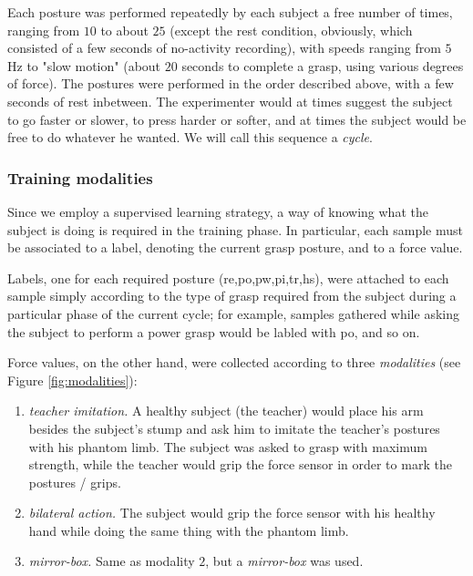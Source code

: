 \documentclass[review,authoryear]{elsarticle}
\def\re{\textsf{re}}
\def\po{\textsf{po}}
\def\pw{\textsf{pw}}
\def\pi{\textsf{pi}}
\def\tr{\textsf{tr}}
\def\hs{\textsf{hs}}
\renewcommand{\cite}{\citep}
\begin{document}
Each posture was performed repeatedly by each subject a free number of times,
ranging from $10$ to about $25$ (except the rest condition, obviously, which consisted
of a few seconds of no-activity recording), with speeds ranging from $5$Hz to
"slow motion" (about $20$ seconds to complete a grasp, using various degrees of
force). The postures were performed in the order described
above, with a few seconds of rest inbetween. The
experimenter would at times suggest the subject to go faster or slower, to press
harder or softer, and at times the subject would be free to do whatever he wanted.
We will call this sequence a \emph{cycle}.

\subsubsection{Training modalities}

Since we employ a supervised learning strategy, a way of knowing what the subject is
doing is required in the training phase. In particular, each sample must be associated
to a label, denoting the current grasp posture, and to a force value.

Labels, one for each required posture (\re,\po,\pw,\pi,\tr,\hs),
were attached to each sample simply according to the
type of grasp required from the subject during a particular phase of the current
cycle; for example, samples gathered while asking the subject to perform a power grasp
would be labled with \po, and so on.

Force values, on the other hand, were collected according to three
\emph{modalities} (see Figure \ref{fig:modalities}):

\begin{enumerate}

  \item \emph{teacher imitation.} A healthy subject (the teacher)
    would place his arm besides the subject's stump and ask him
    to imitate the teacher's postures with his phantom limb. The
    subject was asked to grasp with maximum strength,
    while the teacher would grip the force sensor in order to mark the
    postures / grips.

  \item \emph{bilateral action.} The subject would grip the
    force sensor with his healthy hand while doing the same
    thing with the phantom limb.

  \item \emph{mirror-box.} Same as modality $2$, but a \emph{mirror-box}
    \cite{mirror-box} was used.

\end{enumerate}
\end{document}
